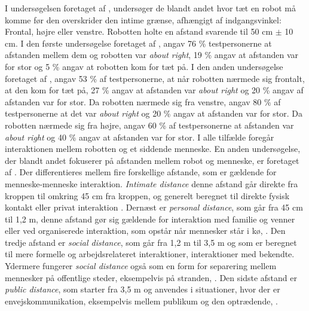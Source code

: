 I undersøgelsen foretaget af \textcite{PDF:HowMayIServeYou}, undersøger de blandt andet hvor tæt en robot må komme før den overskrider den intime grænse, afhængigt af indgangsvinkel: Frontal, højre eller venstre. Robotten holte en afstand svarende til 50 cm $\pm$ 10 cm. I den første undersøgelse foretaget af \textcite[s. 174]{PDF:HowMayIServeYou}, angav 76 \% testpersonerne at afstanden mellem dem og robotten var \textit{about right}, 19 \% angav at afstanden var for stor og 5 \% angav at robotten kom for tæt på. I den anden undersøgelse foretaget af \textcite[s. 175]{PDF:HowMayIServeYou}, angav 53 \% af testpersonerne, at når robotten nærmede sig frontalt, at den kom for tæt på, 27 \% angav at afstanden var \textit{about right} og 20 \% angav af afstanden var for stor. Da robotten nærmede sig fra venstre, angav 80 \% af testpersonerne at det var \textit{about right} og 20 \% angav at afstanden var for stor. Da robotten nærmede sig fra højre, angav 60 \% af testpersonerne at afstanden var \textit{about right} og 40 \% angav at afstanden var for stor. I alle tilfælde foregår interaktionen mellem robotten og et siddende menneske. \blankline
%
En anden undersøgelse, der blandt andet fokuserer på afstanden mellem robot og menneske, er foretaget af \textcite{PDF:HumanRobotEmodiedInteraction}. Der differentieres mellem fire forskellige afstande, som er gældende for menneske-menneske interaktion. \textit{Intimate distance} denne afstand går direkte fra kroppen til omkring 45 cm fra kroppen, og generelt beregnet til direkte fysisk kontakt eller privat interaktion \parencite[s. 165]{PDF:HumanRobotEmodiedInteraction}. Dernæst er \textit{personal distance}, som går fra 45 cm til 1,2 m, denne afstand gør sig gældende for interaktion med familie og venner eller ved organiserede interaktion, som opstår når mennesker står i kø, \parencite[s. 165]{PDF:HumanRobotEmodiedInteraction}. Den tredje afstand er \textit{social distance}, som går fra 1,2 m til 3,5 m og som er beregnet til mere formelle og arbejdsrelateret interaktioner, interaktioner med bekendte. Ydermere fungerer \textit{social distance} også som en form for separering mellem mennesker på offentlige steder, eksempelvis på stranden, \parencite[s. 165]{PDF:HumanRobotEmodiedInteraction}. Den sidste afstand er \textit{public distance}, som starter fra 3,5 m og anvendes i situationer, hvor der er envejskommunikation, eksempelvis mellem publikum og den optrædende, \parencite[s. 165]{PDF:HumanRobotEmodiedInteraction}.

